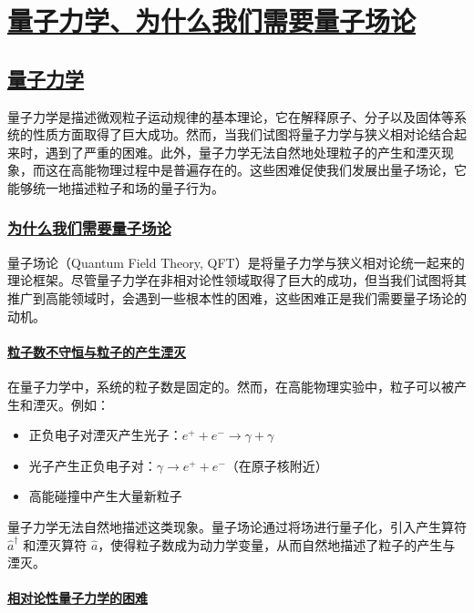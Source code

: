 \chapter{\protect\hyperlink{:}{量子力学、为什么我们需要量子场论}}



\section{\protect\hyperlink{:}{量子力学}}

量子力学是描述微观粒子运动规律的基本理论，它在解释原子、分子以及固体等系统的性质方面取得了巨大成功。然而，当我们试图将量子力学与狭义相对论结合起来时，遇到了严重的困难。此外，量子力学无法自然地处理粒子的产生和湮灭现象，而这在高能物理过程中是普遍存在的。这些困难促使我们发展出量子场论，它能够统一地描述粒子和场的量子行为。

\subsection{\protect\hyperlink{:}{为什么我们需要量子场论}}

量子场论（Quantum Field Theory, QFT）是将量子力学与狭义相对论统一起来的理论框架。尽管量子力学在非相对论性领域取得了巨大的成功，但当我们试图将其推广到高能领域时，会遇到一些根本性的困难，这些困难正是我们需要量子场论的动机。

\subsubsection{\protect\hyperlink{:}{粒子数不守恒与粒子的产生湮灭}}

在量子力学中，系统的粒子数是固定的。然而，在高能物理实验中，粒子可以被产生和湮灭。例如：
\begin{itemize}
    \item 正负电子对湮灭产生光子：$e^+ + e^- \to \gamma + \gamma$
    \item 光子产生正负电子对：$\gamma \to e^+ + e^-$（在原子核附近）
    \item 高能碰撞中产生大量新粒子
\end{itemize}

量子力学无法自然地描述这类现象。量子场论通过将场进行量子化，引入产生算符 $\hat{a}^\dagger$ 和湮灭算符 $\hat{a}$，使得粒子数成为动力学变量，从而自然地描述了粒子的产生与湮灭。

\subsubsection{\protect\hyperlink{:}{相对论性量子力学的困难}}

